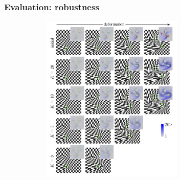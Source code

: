 \documentclass[serif,mathserif]{beamer}
\begin{document}
\begin{frame}
 \frametitle{Evaluation: robustness}
 \begin{figure}[t]
  \centering
  \includegraphics[width=9cm, height=8cm]{img/robustness.png}
 \end{figure}
\end{frame}
\end{document}
